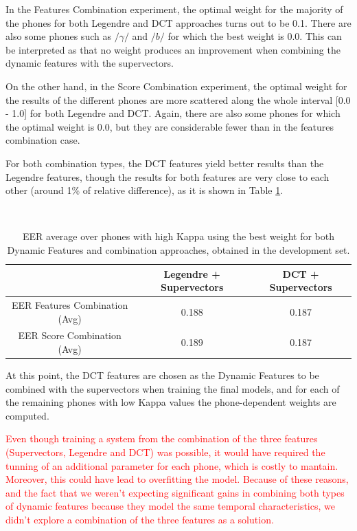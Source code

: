 In the Features Combination experiment,
the optimal weight for the majority of the phones
for both Legendre and DCT approaches turns out to be 0.1.
There are also some phones such as
$/\gamma/$ and $/b/$ for which the best weight is 0.0.
This can be interpreted as that
no weight produces an improvement when combining the dynamic features with the supervectors.

On the other hand, in the Score Combination experiment, the optimal weight for
the results of the different phones are more scattered along the whole interval [0.0 - 1.0]
for both Legendre and
DCT. Again, there are also some phones for which the optimal weight is 0.0, but they are
considerable fewer than in the features combination case.

For both combination types, the DCT features yield better results than the Legendre features,
though the results for both features are very close to each other (around 1\% of relative
difference), as it is shown in Table \ref{table:legendreVsDCTCombinations}.

~

\begin{table}[h]
	\renewcommand{\arraystretch}{1.5}
	\begin{center}
	    \begin{tabular}{ | c | c | c | }
	    \hline
	    & Legendre + Supervectors & DCT + Supervectors \\ \hline
	    EER Features Combination (Avg) & 0.188 & 0.187 \\ \hline
	    EER Score Combination (Avg) & 0.189  & 0.187 \\ \hline
	    \end{tabular}
	    \caption{EER average over phones with high Kappa using the best weight for
	    both Dynamic Features and combination approaches, obtained in the development set.}
	    \label{table:legendreVsDCTCombinations}
	\end{center}
\end{table}

At this point, the DCT features are chosen as the Dynamic Features to be combined with the
supervectors when training the final models, and for each of the remaining phones with
low Kappa values the phone-dependent weights are computed.

\textcolor{red}{
Even though training a system from the combination of the three features
(Supervectors, Legendre and DCT) was possible, it would have required the tunning of
an additional parameter for each phone, which is costly to mantain. Moreover, this
could have lead to overfitting the model. Because of these reasons, and the fact
that we weren't expecting significant gains in combining both types of dynamic features
because they model the same temporal characteristics,
we didn't explore a combination of the three features as a solution.
}

